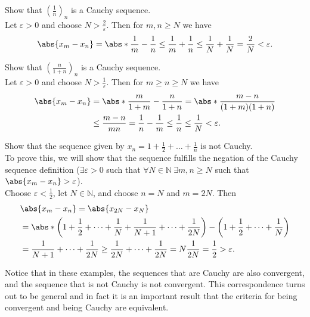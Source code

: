 \documentclass[../real_analysis.tex]{subfiles}
\begin{document}
        \begin{example}
            Show that $\left(\frac{1}{n}\right)_n$ is a Cauchy sequence.\\
            Let $\varepsilon>0$ and choose $N>\frac{2}{\varepsilon}$. Then for $m,n\geq N$ we have
            \begin{equation*}
                \abs{x_m-x_n}=\abs*{\frac{1}{m}-\frac{1}{n}}\leq\frac{1}{m}+\frac{1}{n}\leq\frac{1}{N}+\frac{1}{N}=\frac{2}{N}<\varepsilon.
            \end{equation*}
        \end{example}
        \begin{example}
            Show that $\left(\frac{n}{1+n}\right)_n$ is a Cauchy sequence.\\
            Let $\varepsilon>0$ and choose $N>\frac{1}{\varepsilon}$. Then for $m\geq n\geq N$ we have
            \begin{align*}
                \abs{x_m-x_n}&=\abs*{\frac{m}{1+m}-\frac{n}{1+n}}=\abs*{\frac{m-n}{(1+m)(1+n)}}\\
                &\leq\frac{m-n}{mn}=\frac{1}{n}-\frac{1}{m}\leq\frac{1}{n}\leq\frac{1}{N}<\varepsilon.
            \end{align*}
        \end{example}
        \begin{example}
            Show that the sequence given by $x_n=1+\frac{1}{2}+\dots+\frac{1}{n}$ is not Cauchy.\\
            To prove this, we will show that the sequence fulfills the negation of the Cauchy sequence definition ($\exists\varepsilon>0$ such that $\forall N\in\mathbb{N}\ \exists m,n\geq N$ such that $\abs{x_m-x_n}>\varepsilon$).\\
            Choose $\varepsilon<\frac{1}{2}$, let $N\in\mathbb{N}$, and choose $n=N$ and $m=2N$. Then
            \begin{align*}
                &\abs{x_m-x_n}=\abs{x_{2N}-x_N}\\
                &=\abs*{\left(1+\frac{1}{2}+\dots+\frac{1}{N}+\frac{1}{N+1}+\dots+\frac{1}{2N}\right)-\left(1+\frac{1}{2}+\dots+\frac{1}{N}\right)}\\
                &=\frac{1}{N+1}+\dots+\frac{1}{2N}\geq\frac{1}{2N}+\dots+\frac{1}{2N}=N\frac{1}{2N}=\frac{1}{2}>\varepsilon.
            \end{align*}
        \end{example}
        Notice that in these examples, the sequences that are Cauchy are also convergent, and the sequence that is not Cauchy is not convergent. This correspondence turns out to be general and in fact it is an important result that the criteria for being convergent and being Cauchy are equivalent.
\end{document}
